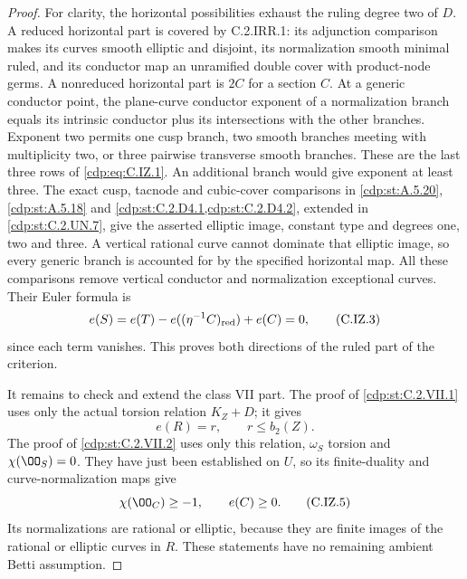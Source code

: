 \begin{proof}
For clarity, the horizontal possibilities exhaust the
ruling degree two of $D$. A reduced horizontal part is
covered by C.2.IRR.1: its adjunction comparison makes its
curves smooth elliptic and disjoint, its normalization
smooth minimal ruled, and its conductor map an unramified
double cover with product-node germs. A nonreduced
horizontal part is $2C$ for a section $C$. At a generic
conductor point, the plane-curve conductor exponent of a
normalization branch equals its intrinsic conductor plus
its intersections with the other branches. Exponent two
permits one cusp branch, two smooth branches meeting with
multiplicity two, or three pairwise transverse smooth
branches. These are the last three rows of \eqref{cdp:eq:C.IZ.1}.
An additional branch would give exponent at least three.
The exact cusp, tacnode and cubic-cover comparisons in
\ref{cdp:st:A.5.20}, \ref{cdp:st:A.5.18} and \cref{cdp:st:C.2.D4.1,cdp:st:C.2.D4.2}, extended in \ref{cdp:st:C.2.UN.7},
give the asserted elliptic image, constant type and
degrees one, two and three. A vertical rational curve
cannot dominate that elliptic image, so every generic
branch is accounted for by the specified horizontal map.
All these comparisons remove vertical conductor and
normalization exceptional curves. Their Euler formula is
\[
 e(S)=e(T)-e((\eta^{-1}C)_{\rm red})+e(C)=0,             \tag{C.IZ.3}\label{cdp:eq:C.IZ.3}
\]
since each term vanishes. This proves both directions of
the ruled part of the criterion.

It remains to check and extend the class VII part. The
proof of \ref{cdp:st:C.2.VII.1} uses only the actual torsion relation
$K_Z+D$; it gives
\[
 e(R)=r,\qquad r\le b_2(Z).                              \tag{C.IZ.4}\label{cdp:eq:C.IZ.4}
\]
The proof of \ref{cdp:st:C.2.VII.2} uses only this relation,
$\omega_S$ torsion and $\chi(\OO_S)=0$. They have just
been established on $U$, so its finite-duality and
curve-normalization maps give
\[
 \chi(\OO_C)\ge-1,\qquad e(C)\ge0.                      \tag{C.IZ.5}\label{cdp:eq:C.IZ.5}
\]
Its normalizations are rational or elliptic, because they
are finite images of the rational or elliptic curves in
$R$. These statements have no remaining ambient Betti
assumption.


\end{proof}

